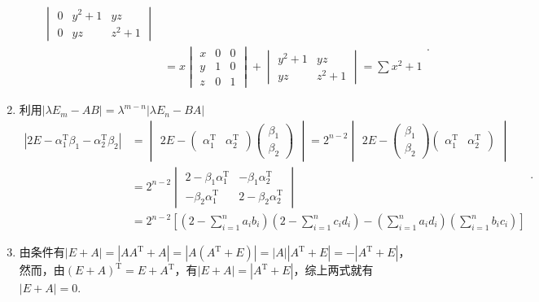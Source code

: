 \begin{enumerate}
\begin{enumerate}
\[\begin{aligned}
\begin{vmatrix}
        0&y^2+1&yz\\
        0&yz&z^2+1
        \end{vmatrix}\\
        &=x\begin{vmatrix}
        x&0&0\\
        y&1&0\\
        z&0&1
        \end{vmatrix}+\begin{vmatrix}
        y^2+1&yz\\
        yz&z^2+1
        \end{vmatrix}
        =\sum x^2+1
        \end{aligned}.\]
    \end{enumerate}

    \item 利用$|\lambda E_m-AB|=\lambda^{m-n}|\lambda E_n-BA|$
    \[\begin{aligned}
    |2E-\alpha_1^\mathrm{T}\beta_1-\alpha_2^\mathrm{T}\beta_2|
    &=\begin{vmatrix}
    2E-\begin{pmatrix}
    \alpha_1^\mathrm{T}&\alpha_2^\mathrm{T}
    \end{pmatrix}\begin{pmatrix}
    \beta_1\\\beta_2
    \end{pmatrix}
    \end{vmatrix}
    =2^{n-2}\begin{vmatrix}
    2E-\begin{pmatrix}
    \beta_1\\\beta_2
    \end{pmatrix}\begin{pmatrix}
    \alpha_1^\mathrm{T}&\alpha_2^\mathrm{T}
    \end{pmatrix}
    \end{vmatrix}\\
    &=2^{n-2}\begin{vmatrix}
    2-\beta_1\alpha_1^\mathrm{T}&-\beta_1\alpha_2^\mathrm{T}\\
    -\beta_2\alpha_1^\mathrm{T}&2-\beta_2\alpha_2^\mathrm{T}
    \end{vmatrix}\\
    &=2^{n-2}
    \left[\left(2-\sum_{i=1}^na_ib_i\right)
    \left(2-\sum_{i=1}^nc_id_i\right)
    -\left(\sum_{i=1}^na_id_i\right)
    \left(\sum_{i=1}^nb_ic_i\right)\right]
    \end{aligned}.
    \]

    \item 由条件有$|E+A|=|AA^\mathrm{T}+A|=|A(A^\mathrm{T}+E)|=|A||A^\mathrm{T}+E|=-|A^\mathrm{T}+E|$，然而，由$(E+A)^\mathrm{T}=E+A^\mathrm{T}$，有$|E+A|=|A^\mathrm{T}+E|$，综上两式就有$|E+A|=0$.
\end{enumerate}

\clearpage
